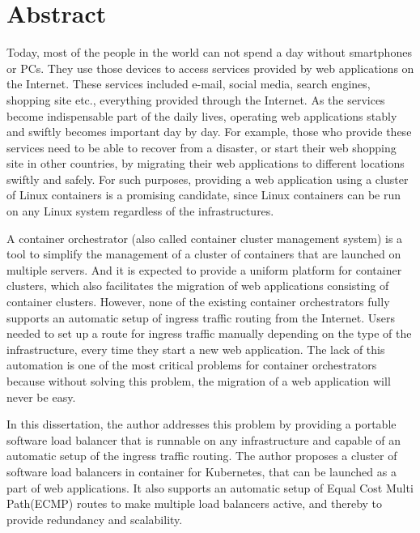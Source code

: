 \chapter*{Abstract}

Today, most of the people in the world can not spend a day without smartphones or PCs.
They use those devices to access services provided by web applications on the Internet.
These services included e-mail, social media, search engines, shopping site etc., everything provided through the Internet.
As the services become indispensable part of the daily lives, operating web applications stably and swiftly becomes important day by day.
For example, those who provide these services need to be able to recover from a disaster, or start their web shopping site in other countries,
by migrating their web applications to different locations swiftly and safely.
For such purposes, providing a web application using a cluster of Linux containers is a promising candidate, since Linux containers can be run on any Linux system regardless of the infrastructures.


A container orchestrator (also called container cluster management system) is a tool to simplify the management of a cluster of containers that are launched on multiple servers.
And it is expected to provide a uniform platform for container clusters, which also facilitates the migration of web applications consisting of container clusters.
However, none of the existing container orchestrators fully supports an automatic setup of ingress traffic routing from the Internet.
Users needed to set up a route for ingress traffic manually depending on the type of the infrastructure, every time they start a new web application.
The lack of this automation is one of the most critical problems for container orchestrators because without solving this problem, the migration of a web application will never be easy.

In this dissertation, the author addresses this problem by providing a portable software load balancer that is runnable on any infrastructure and capable of an automatic setup of the ingress traffic routing.
The author proposes a cluster of software load balancers in container for Kubernetes, that can be launched as a part of web applications.
It also supports an automatic setup of Equal Cost Multi Path(ECMP) routes to make multiple load balancers active, and thereby to provide redundancy and scalability.

